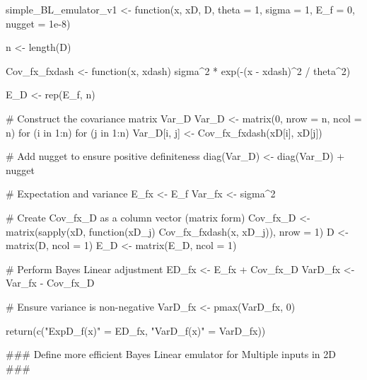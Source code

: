 simple_BL_emulator_v1 <- function(x, xD, D, theta = 1, sigma = 1, E_f = 0, nugget = 1e-8) {
  n <- length(D)
  
  Cov_fx_fxdash <- function(x, xdash) sigma^2 * exp(-(x - xdash)^2 / theta^2)
  
  E_D <- rep(E_f, n)
  
  # Construct the covariance matrix Var_D
  Var_D <- matrix(0, nrow = n, ncol = n)
  for (i in 1:n) {
    for (j in 1:n) {
      Var_D[i, j] <- Cov_fx_fxdash(xD[i], xD[j])
    }
  }
  
  # Add nugget to ensure positive definiteness
  diag(Var_D) <- diag(Var_D) + nugget
  
  # Expectation and variance
  E_fx <- E_f
  Var_fx <- sigma^2
  
  # Create Cov_fx_D as a column vector (matrix form)
  Cov_fx_D <- matrix(sapply(xD, function(xD_j) Cov_fx_fxdash(x, xD_j)), nrow = 1)
  D <- matrix(D, ncol = 1)
  E_D <- matrix(E_D, ncol = 1)
  
  # Perform Bayes Linear adjustment
  ED_fx <- E_fx + Cov_fx_D %
  VarD_fx <- Var_fx - Cov_fx_D %
  
  # Ensure variance is non-negative
  VarD_fx <- pmax(VarD_fx, 0)
  
  return(c("ExpD_f(x)" = ED_fx, "VarD_f(x)" = VarD_fx))
}

### Define more efficient Bayes Linear emulator for Multiple inputs in 2D ###

